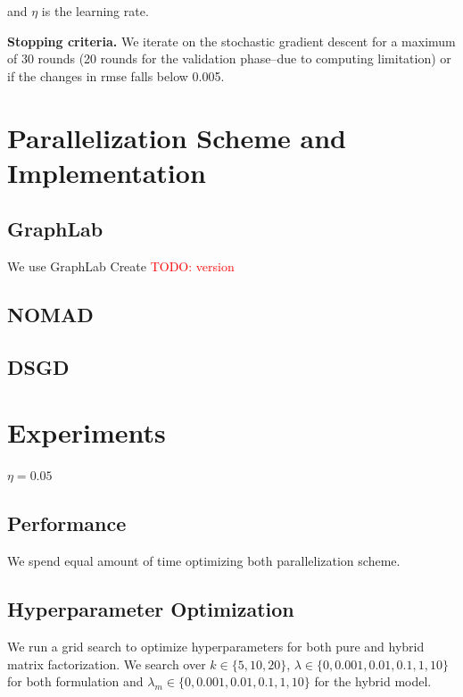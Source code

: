 \documentclass{article} %
\newcommand{\todo}[1]{\textcolor{red}{TODO: #1}}
\begin{document}
\begin{center}
and $\eta$ is the learning rate.
\end{center}

\textbf{Stopping criteria.}   We iterate on the stochastic gradient descent
for a maximum of 30 rounds (20 rounds for the validation phase--due to
computing limitation)   or if the changes in rmse falls below 0.005.



\section{Parallelization Scheme and Implementation}

\subsection{GraphLab}

We use GraphLab Create \todo{version}

\subsection{NOMAD}

\subsection{DSGD}



\section{Experiments}

$\eta=0.05$

\subsection{Performance}

We spend equal amount of time optimizing both parallelization scheme.

\subsection{Hyperparameter Optimization}

We run a grid search to optimize hyperparameters for both pure and hybrid
matrix factorization. We search over $k \in \{5, 10, 20\}$, $\lambda \in \{0,
0.001, 0.01, 0.1, 1, 10\}$ for both formulation and $\lambda_m \in \{0,
0.001, 0.01, 0.1, 1, 10\}$ for the hybrid model.
\end{document}
